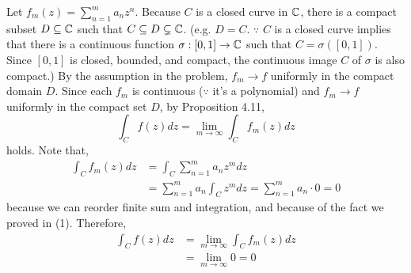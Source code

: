Let \(f_m(z) = \sum_{n=1}^{m} a_n z^n\).
Because \(C\) is a closed curve in \(\mathbb{C}\), there is a compact subset \(D \subseteq \mathbb{C}\) such that
\(C \subseteq D \subsetneq \mathbb{C}\).
(e.g. \(D = C\). \(\because\) \(C\) is a closed curve implies that there is a continuous function
\(\sigma: [0, 1] \to \mathbb{C}\) such that \(C = \sigma([0, 1])\).
Since \([0, 1]\) is closed, bounded, and compact, the continuous image \(C\) of \(\sigma\) is also compact.)
By the assumption in the problem, \(f_m \to f\) uniformly in the compact domain \(D\).
Since each \(f_m\) is continuous (\(\because\) it's a polynomial)
and \(f_m \to f\) uniformly in the compact set \(D\), by Proposition 4.11,
\[
\int_C f(z) dz =
\lim_{m \to \infty} \int_C f_m(z) dz
\]
holds.
Note that,
\begin{align*}
\int_C f_m(z) dz
&= \int_C \sum_{n=1}^{m} a_n z^m dz
\\&= \sum_{n=1}^{m} a_n \int_C z^m dz
= \sum_{n=1}^{m} a_n \cdot 0 = 0
\end{align*}
because we can reorder finite sum and integration, and because of the fact we proved in (1).
Therefore,
\begin{align*}
\int_C f(z) dz
&= \lim_{m \to \infty} \int_C f_m(z) dz
\\&= \lim_{m \to \infty} 0 = 0
\end{align*}
\qedsq